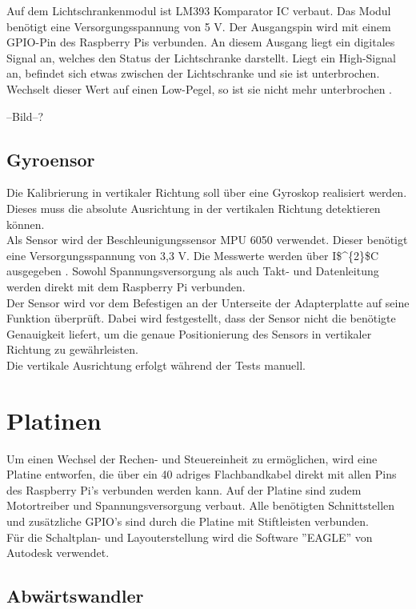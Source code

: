 Auf dem Lichtschrankenmodul ist LM393 Komparator \ac{IC} verbaut. Das Modul benötigt eine Versorgungsspannung von 5 V. Der Ausgangspin wird mit einem \ac{GPIO}-Pin des Raspberry Pis verbunden. An diesem Ausgang liegt ein digitales Signal an, welches den Status der Lichtschranke darstellt. Liegt ein High-Signal an, befindet sich etwas zwischen der Lichtschranke und sie ist unterbrochen. Wechselt dieser Wert auf einen Low-Pegel, so ist sie nicht mehr unterbrochen \cite{LM393}. 

--Bild--? 

\subsection{Gyroensor}


Die Kalibrierung in vertikaler Richtung soll über eine Gyroskop realisiert werden. Dieses muss die absolute Ausrichtung in der vertikalen Richtung detektieren können. \\ 
Als Sensor wird der Beschleunigungssensor MPU 6050 verwendet. Dieser benötigt eine Versorgungsspannung von 3,3 V. Die Messwerte werden über \ac{I$^{2}$C} ausgegeben \cite{MPU-6050}. Sowohl Spannungsversorgung als auch Takt- und Datenleitung werden direkt mit dem Raspberry Pi verbunden. \\ 
Der Sensor wird vor dem Befestigen an der Unterseite der Adapterplatte auf seine Funktion überprüft. Dabei wird festgestellt, dass der Sensor nicht die benötigte Genauigkeit liefert, um die genaue Positionierung des Sensors in vertikaler Richtung zu gewährleisten. \\
Die vertikale Ausrichtung erfolgt während der Tests manuell.


\section{Platinen}

Um einen Wechsel der Rechen- und Steuereinheit zu ermöglichen, wird eine Platine entworfen, die über ein 40 adriges Flachbandkabel direkt mit allen Pins des Raspberry Pi's verbunden werden kann. Auf der Platine sind zudem Motortreiber und Spannungsversorgung verbaut. Alle benötigten Schnittstellen und zusätzliche \ac{GPIO}’s sind durch die Platine mit Stiftleisten verbunden.\\
Für die Schaltplan- und Layouterstellung wird die Software ''EAGLE'' von Autodesk verwendet.


\subsection{Abwärtswandler} 

